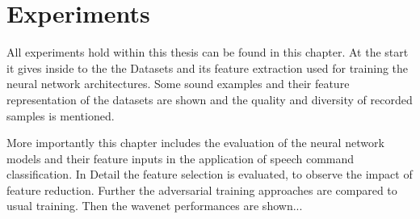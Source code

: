 
\chapter{Experiments}\label{sec:exp}
All experiments hold within this thesis can be found in this chapter.
At the start it gives inside to the the Datasets and its feature extraction used for training the neural network architectures.
Some sound examples and their feature representation of the datasets are shown and the quality and diversity of recorded samples is mentioned.

More importantly this chapter includes the evaluation of the neural network models and their feature inputs in the application of speech command classification.
In Detail the feature selection is evaluated, to observe the impact of feature reduction.
Further the adversarial training approaches are compared to usual training.
Then the wavenet performances are shown...













